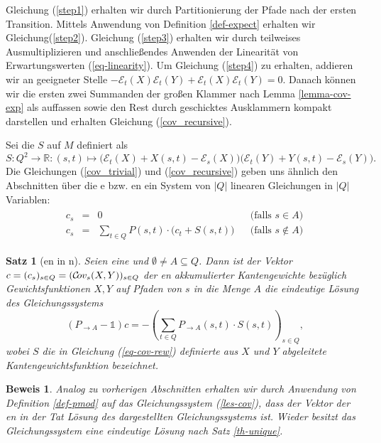 \documentclass[a4paper]{article}
\newtheorem{satz}{Satz}[section] %
\theoremstyle{nonumberplain}
\newtheorem{beweis}{Beweis}
\begin{document}
Gleichung (\ref{step1}) erhalten wir durch Partitionierung der Pfade nach der ersten Transition.
Mittels Anwendung von Definition \ref{def-expect} erhalten wir Gleichung(\ref{step2}).
Gleichung (\ref{step3}) erhalten wir durch teilweises Ausmultiplizieren und anschließendes Anwenden der Linearität von Erwartungswerten (\ref{eq-linearity}). Um Gleichung (\ref{step4}) zu erhalten, addieren wir an geeigneter Stelle $- \mathcal{E}_{t}(X)\mathcal{E}_{t}(Y) + \mathcal{E}_{t}(X)\mathcal{E}_{t}(Y) = 0$. Danach können wir die ersten zwei Summanden der großen Klammer nach Lemma \ref{lemma-cov-exp} als \cov{} auffassen sowie den Rest durch geschicktes Ausklammern kompakt darstellen und erhalten Gleichung (\ref{cov_recursive}).

Sei die \reward{} $S$ auf $M$ definiert als
\begin{equation}
S: Q^2 \to \mathbb{R} : (s,t) \mapsto \big(\mathcal{E}_{t}(X) + X(s,t) - \mathcal{E}_{s}(X)\big)\big(\mathcal{E}_{t}(Y) + Y(s,t) - \mathcal{E}_{s}(Y)\big)\text{.} \label{eq-cov-rew}
\end{equation}
Die Gleichungen (\ref{cov_trivial}) und (\ref{cov_recursive}) geben uns ähnlich den Abschnitten über die \expect{}e bzw. \cov{}en ein System von $|Q|$ linearen Gleichungen in $|Q|$ Variablen:
\begin{align}
\begin{aligned}
c_s & = & 0 && \text{(falls $s \in A$)}\\
c_s & = & \sum_{t \in Q}P(s,t) \cdot \big(c_t + S(s,t)\big) && \text{(falls $s \notin A$)} 
\end{aligned} \label{les-cov}
\end{align}
\begin{satz}[\cov{}en in \mc{}n] \label{th-cov}
	Seien \mcex{} eine \mc{} und $\emptyset \neq A\subseteq Q$. Dann ist der Vektor $c = (c_s)_{s \in Q } = (\mathcal{C}\!ov_{s}(X,Y))_{s \in Q }$ der \cov{}en akkumulierter Kantengewichte bezüglich Gewichtsfunktionen $X,Y$ auf Pfaden von $s$ in die Menge $A$ die eindeutige Lösung des Gleichungssystems
	\begin{equation}
	(P_{\rightarrow A} - \mathbb{1}) c = - \left(\sum_{t \in Q}{ P_{\rightarrow A}(s,t) \cdot S(s,t) }\right)_{s \in Q} \text{,}\label{les-cov-mat}
	\end{equation}
	wobei $S$ die in Gleichung (\ref{eq-cov-rew}) definierte aus $X$ und $Y$ abgeleitete Kantengewichtsfunktion bezeichnet.
\end{satz}
\begin{beweis}
	Analog zu vorherigen Abschnitten erhalten wir durch Anwendung von Definition \ref{def-pmod} auf das Gleichungssystem (\ref{les-cov}), dass der Vektor der \cov{}en in der Tat Lösung des dargestellten Gleichungssystems ist. Wieder besitzt das Gleichungssystem eine eindeutige Lösung nach Satz \ref{th-unique}.
\end{beweis}
\end{document}
